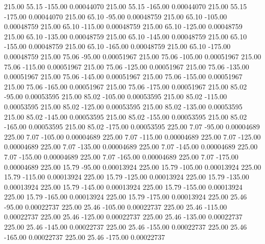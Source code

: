     215.00     55.15   -155.00     0.00044070
    215.00     55.15   -165.00     0.00044070
    215.00     55.15   -175.00     0.00044070
    215.00     65.10    -95.00     0.00048759
    215.00     65.10   -105.00     0.00048759
    215.00     65.10   -115.00     0.00048759
    215.00     65.10   -125.00     0.00048759
    215.00     65.10   -135.00     0.00048759
    215.00     65.10   -145.00     0.00048759
    215.00     65.10   -155.00     0.00048759
    215.00     65.10   -165.00     0.00048759
    215.00     65.10   -175.00     0.00048759
    215.00     75.06    -95.00     0.00051967
    215.00     75.06   -105.00     0.00051967
    215.00     75.06   -115.00     0.00051967
    215.00     75.06   -125.00     0.00051967
    215.00     75.06   -135.00     0.00051967
    215.00     75.06   -145.00     0.00051967
    215.00     75.06   -155.00     0.00051967
    215.00     75.06   -165.00     0.00051967
    215.00     75.06   -175.00     0.00051967
    215.00     85.02    -95.00     0.00053595
    215.00     85.02   -105.00     0.00053595
    215.00     85.02   -115.00     0.00053595
    215.00     85.02   -125.00     0.00053595
    215.00     85.02   -135.00     0.00053595
    215.00     85.02   -145.00     0.00053595
    215.00     85.02   -155.00     0.00053595
    215.00     85.02   -165.00     0.00053595
    215.00     85.02   -175.00     0.00053595
    225.00      7.07    -95.00     0.00004689
    225.00      7.07   -105.00     0.00004689
    225.00      7.07   -115.00     0.00004689
    225.00      7.07   -125.00     0.00004689
    225.00      7.07   -135.00     0.00004689
    225.00      7.07   -145.00     0.00004689
    225.00      7.07   -155.00     0.00004689
    225.00      7.07   -165.00     0.00004689
    225.00      7.07   -175.00     0.00004689
    225.00     15.79    -95.00     0.00013924
    225.00     15.79   -105.00     0.00013924
    225.00     15.79   -115.00     0.00013924
    225.00     15.79   -125.00     0.00013924
    225.00     15.79   -135.00     0.00013924
    225.00     15.79   -145.00     0.00013924
    225.00     15.79   -155.00     0.00013924
    225.00     15.79   -165.00     0.00013924
    225.00     15.79   -175.00     0.00013924
    225.00     25.46    -95.00     0.00022737
    225.00     25.46   -105.00     0.00022737
    225.00     25.46   -115.00     0.00022737
    225.00     25.46   -125.00     0.00022737
    225.00     25.46   -135.00     0.00022737
    225.00     25.46   -145.00     0.00022737
    225.00     25.46   -155.00     0.00022737
    225.00     25.46   -165.00     0.00022737
    225.00     25.46   -175.00     0.00022737
